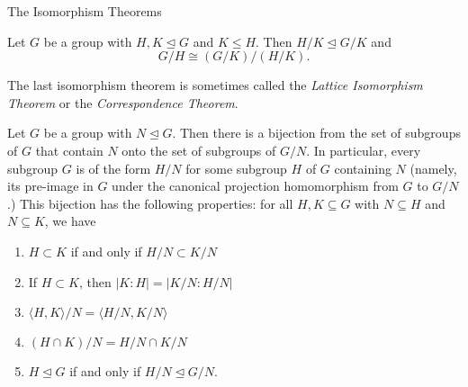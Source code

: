 \begin{section}{The Isomorphism Theorems}
\begin{theorem}
Let $G$ be a group with $H,K\trianglelefteq G$ and $K\leq H$.  Then $H/K\trianglelefteq G/K$ and
\[
G/H\cong (G/K)/(H/K).
\]
\end{theorem}

The last isomorphism theorem is sometimes called the \emph{Lattice Isomorphism Theorem} or the \emph{Correspondence Theorem}.

\begin{theorem}

Let $G$ be a group with $N\trianglelefteq G$. Then there is a bijection from the set of subgroups of $G$ that contain $N$ onto the set of subgroups of $G/N$. In particular, every subgroup $G$ is of the form $H/N$ for some subgroup $H$ of $G$ containing $N$ (namely, its pre-image in $G$ under the canonical projection homomorphism from $G$ to $G/N$.) This bijection has the following properties: for all $H,K \subseteq G$ with  $N\subseteq H$ and $N\subseteq K$, we have
\begin{enumerate}[label=\rm{(\alph*)}]
\item $H\subset K$ if and only if $H/N \subset K/N$
\item If $H\subset K$, then $|K:H|=|K/N:H/N|$
\item $\langle H,K\rangle/N=\langle H/N,K/N\rangle$
\item $(H\cap K)/N=H/N \cap K/N$
\item $H\trianglelefteq G$ if and only if $H/N\trianglelefteq G/N$.
\end{enumerate}
\end{theorem}

\end{section}